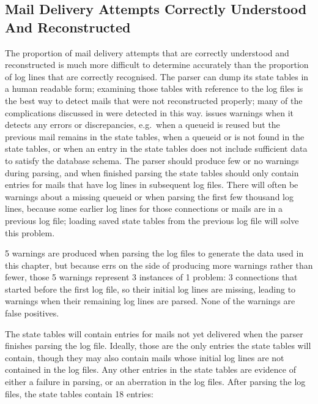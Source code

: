 \subsection{Mail Delivery Attempts Correctly Understood And Reconstructed}

\label{mails-covered}

The proportion of mail delivery attempts that are correctly understood and
reconstructed is much more difficult to determine accurately than the
proportion of log lines that are correctly recognised.  The parser can dump
its state tables in a human readable form; examining those tables with
reference to the log files is the best way to detect mails that were not
reconstructed properly; many of the complications discussed in
 were detected in this way.  \parsername{} issues
warnings when it detects any errors or discrepancies, e.g.\ when a queueid
is reused but the previous mail remains in the state tables, when a queueid
or  is not found in the state tables, or when an entry in the
state tables does not include sufficient data to satisfy the database
schema.  The parser should produce few or no warnings during parsing, and
when finished parsing the state tables should only contain entries for
mails that have log lines in subsequent log files.  There will often be
warnings about a missing queueid or  when parsing the first
few thousand log lines, because some earlier log lines for those connections
or mails are in a previous log file; loading saved state tables from the
previous log file will solve this problem.

5 warnings are produced when parsing the \numberOFlogFILES{} log files to
generate the data used in this chapter, but because \parsername{} errs on
the side of producing more warnings rather than fewer, those 5 warnings
represent 3 instances of 1 problem: 3 connections that started before the
first log file, so their initial log lines are missing, leading to warnings
when their remaining log lines are parsed.  None of the warnings are false
positives.

The state tables will contain entries for mails not yet delivered when the
parser finishes parsing the log file.  Ideally, those are the only entries
the state tables will contain, though they may also contain mails whose
initial log lines are not contained in the log files.  Any other entries in
the state tables are evidence of either a failure in parsing, or an
aberration in the log files.  After parsing the \numberOFlogFILES{} log
files, the state tables contain 18 entries:

